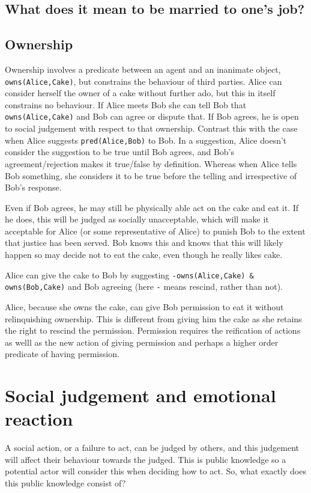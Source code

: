 \documentclass[a4paper]{article}
\begin{document}
\subsection{What does it mean to be married to one's job?}


\subsection{Ownership}

Ownership involves a predicate between an agent and an inanimate object, \texttt{owns(Alice,Cake)}, but constrains the behaviour of third parties. Alice can consider herself the owner of a cake without further ado, but this in itself constrains no behaviour. If Alice meets Bob she can tell Bob that \texttt{owns(Alice,Cake)} and Bob can agree or dispute that. If Bob agrees, he is open to social judgement with respect to that ownership. Contrast this with the case when Alice suggests \texttt{pred(Alice,Bob)} to Bob. In a suggestion, Alice doesn't consider the suggestion to be true until Bob agrees, and Bob's agreement/rejection makes it true/false by definition. Whereas when Alice tells Bob something, she considers it to be true before the telling and irrespective of Bob's response.

Even if Bob agrees, he may still be physically able act on the cake and eat it. If he does, this will be judged as socially unacceptable, which will make it acceptable for Alice (or some representative of Alice) to punish Bob to the extent that justice has been served. Bob knows this and knows that this will likely happen so may decide not to eat the cake, even though he really likes cake.

Alice can give the cake to Bob by suggesting \texttt{-owns(Alice,Cake) \& owns(Bob,Cake)} and Bob agreeing (here \texttt{-} means rescind, rather than not).

Alice, because she owns the cake, can give Bob permission to eat it without relinquishing ownership. This is different from giving him the cake as she retains the right to rescind the permission. Permission requires the reification of actions as welll as the new action of giving permission and perhaps a higher order predicate of having permission.

\section{Social judgement and emotional reaction}

A social action, or a failure to act, can be judged by others, and this judgement will affect their behaviour towards the judged. This is public knowledge so a potential actor will consider this when deciding how to act. So, what exactly does this public knowledge consist of?
\end{document}
